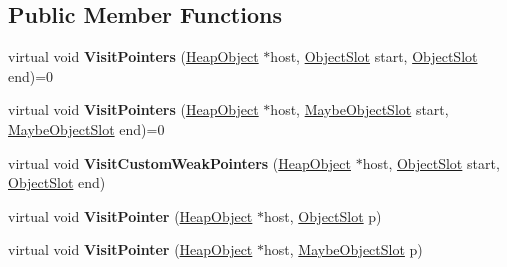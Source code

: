 \subsection*{Public Member Functions}
\begin{DoxyCompactItemize}
\item 
\mbox{\label{classv8_1_1internal_1_1ObjectVisitor_ac9b1e64a843301d26f77ed79e1cda125}} 
virtual void {\bfseries Visit\+Pointers} (\mbox{\hyperlink{classv8_1_1internal_1_1HeapObject}{Heap\+Object}} $\ast$host, \mbox{\hyperlink{classv8_1_1internal_1_1ObjectSlot}{Object\+Slot}} start, \mbox{\hyperlink{classv8_1_1internal_1_1ObjectSlot}{Object\+Slot}} end)=0
\item 
\mbox{\label{classv8_1_1internal_1_1ObjectVisitor_ab97e896c265f9c1a40252db17b96b234}} 
virtual void {\bfseries Visit\+Pointers} (\mbox{\hyperlink{classv8_1_1internal_1_1HeapObject}{Heap\+Object}} $\ast$host, \mbox{\hyperlink{classv8_1_1internal_1_1MaybeObjectSlot}{Maybe\+Object\+Slot}} start, \mbox{\hyperlink{classv8_1_1internal_1_1MaybeObjectSlot}{Maybe\+Object\+Slot}} end)=0
\item 
\mbox{\label{classv8_1_1internal_1_1ObjectVisitor_a0cb19d6850905f138e2592528f1364ed}} 
virtual void {\bfseries Visit\+Custom\+Weak\+Pointers} (\mbox{\hyperlink{classv8_1_1internal_1_1HeapObject}{Heap\+Object}} $\ast$host, \mbox{\hyperlink{classv8_1_1internal_1_1ObjectSlot}{Object\+Slot}} start, \mbox{\hyperlink{classv8_1_1internal_1_1ObjectSlot}{Object\+Slot}} end)
\item 
\mbox{\label{classv8_1_1internal_1_1ObjectVisitor_ad99dabe9a965de13b345446b03944484}} 
virtual void {\bfseries Visit\+Pointer} (\mbox{\hyperlink{classv8_1_1internal_1_1HeapObject}{Heap\+Object}} $\ast$host, \mbox{\hyperlink{classv8_1_1internal_1_1ObjectSlot}{Object\+Slot}} p)
\item 
\mbox{\label{classv8_1_1internal_1_1ObjectVisitor_ab14aece15e03d6e07869c85965c99491}} 
virtual void {\bfseries Visit\+Pointer} (\mbox{\hyperlink{classv8_1_1internal_1_1HeapObject}{Heap\+Object}} $\ast$host, \mbox{\hyperlink{classv8_1_1internal_1_1MaybeObjectSlot}{Maybe\+Object\+Slot}} p)
\item 

\end{DoxyCompactItemize}

